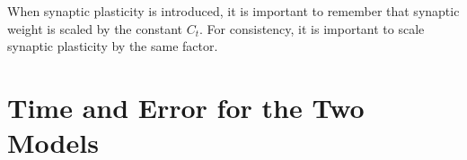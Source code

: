 	When synaptic plasticity is introduced, it is important to remember that synaptic weight is scaled by the constant $C_t$.
	For consistency, it is important to scale synaptic plasticity by the same factor.


\section{Time and Error for the Two Models}
 	\label{ssecAnalysisOfErrorsForTheTwoModels}
% 
	
